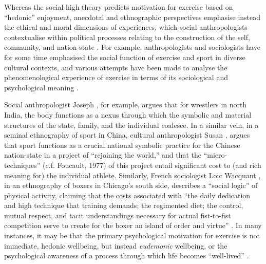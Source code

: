 \begin{CJK}{UTF8}{gbsn}
Whereas the social high theory predicts motivation for exercise based on ``hedonic'' enjoyment, anecdotal and ethnographic perspectives emphasise instead the ethical and moral dimensions of experiences, which social anthropologists contextualise within political processes relating to the construction of the self, community, and nation-state \citep{Alter1993,Brownell1995,Downey2005,Wacquant2004}.
For example, anthropologists and sociologists have for some time emphasised the social function of exercise and sport in diverse cultural contexts, and various attempts have been made to analyse the phenomenological experience of exercise in terms of its sociological and psychological meaning \citep{Bourdieu1978}.

Social anthropologist Joseph \textcite{Alter1993}, for example, argues that for wrestlers in north India, the body functions as a nexus through which the symbolic and material structures of the state, family, and the individual coalesce.  In a similar vein, in a seminal ethnography of sport in China, cultural anthropologist Susan \textcite{Brownell1995}, argues that sport functions as a crucial national symbolic practice for the Chinese nation-state in a project of ``rejoining the world,'' and that the ``micro-techniques'' (c.f. Foucault, 1977) of this project entail significant cost to (and rich meaning for) the individual athlete.   Similarly, French sociologist Loic Wacquant \textcite{Wacquant2004}, in an ethnography of boxers in Chicago's south side, describes a ``social logic'' of physical activity, claiming that the costs associated with ``the daily dedication and high technique that training demands; the regimented diet; the control, mutual respect, and tacit understandings necessary for actual fist-to-fist competition serve to create for the boxer an island of order and virtue'' \textcite[17]{Wacquant2004}. In many instances, it may be that the primary psychological motivation for exercise is not immediate, hedonic wellbeing, but instead \textit{eudemonic} wellbeing, or the psychological awareness of a process through which life becomes ``well-lived'' \citep{Fave2009,Huta2013}.


\end{CJK}
